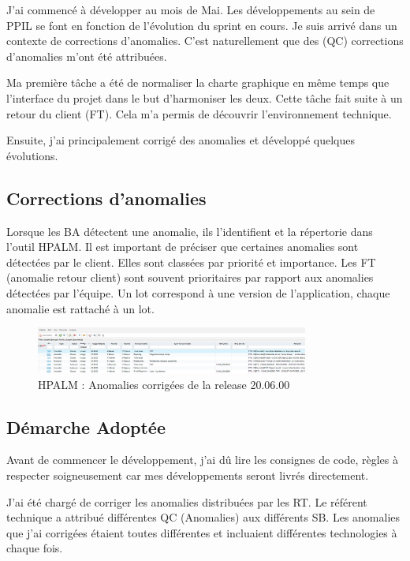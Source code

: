 J'ai commencé à développer au mois de Mai. Les développements au sein de PPIL se font en fonction de l'évolution du sprint en cours. Je suis arrivé dans un contexte de corrections d'anomalies. C'est naturellement que des (QC) corrections d'anomalies m'ont été attribuées.

Ma première tâche a été de normaliser la charte graphique en même temps que l'interface du projet dans le but d'harmoniser les deux. Cette tâche fait suite à un retour du client (FT). Cela m'a permis de découvrir l'environnement technique. 

Ensuite, j'ai principalement corrigé des anomalies et développé quelques évolutions.

\subsection{Corrections d'anomalies}

Lorsque les BA détectent une anomalie, ils l'identifient et la répertorie dans l'outil HPALM. Il est important de préciser que certaines anomalies sont détectées par le client. Elles sont classées par priorité et importance.
Les FT (anomalie retour client) sont souvent prioritaires par rapport aux anomalies détectées par l'équipe.
Un lot correspond à une version de l'application, chaque anomalie est rattaché à un lot.

\begin{figure}[h]
\centering
\includegraphics[width=0.8\textwidth]{images/HPLMliste.png}
\caption{HPALM : Anomalies corrigées de la release 20.06.00}
\end{figure}

\subsection{Démarche Adoptée}

Avant de commencer le développement, j'ai dû lire les consignes de code, règles à respecter soigneusement car mes développements seront livrés directement.

J'ai été chargé de corriger les anomalies distribuées par les RT.
Le référent technique a attribué différentes QC (Anomalies) aux différents SB. 
Les anomalies que j'ai corrigées étaient toutes différentes et incluaient différentes technologies à chaque fois.

